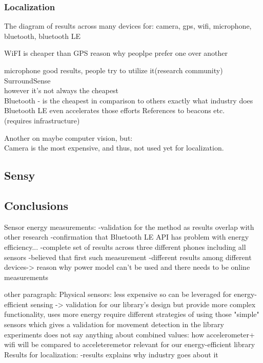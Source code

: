 		
\subsubsection{Localization}

The diagram of results across many devices for: camera, gps, wifi, microphone, bluetooth, bluetooth LE

WiFI is cheaper than GPS
	reason why peoplpe prefer one over another				
				
microphone good results, people try to utilize it(research community)\\
				SurroundSense \cite{azizyan:surroundsense}\\
				however it's not always the cheapest\\
	
Bluetooth - is the cheapest in comparison to others
				exactly what industry does\\
				Bluetooth LE even accelerates those efforts
				References to beacons etc.\\
				(requires infrastructure)
				
Another on maybe computer vision, but:				\\
	Camera is the most expensive, and thus, not used yet for localization.\\
	
			
								
\subsection{Sensy}
\subsection{Conclusions}
Sensor energy measurements:
	-validation for the method
			as results overlap with other research
	-confirmation that Bluetooth LE API has problem with energy efficiency...
	-complete set of results across three different phones including all sensors
		-believed that first such measurement
	-different results among different devices-> reason why power model can't be used and there needs to be online measurements

other paragraph:
	Physical sensors:
		less expensive so can be leveraged for energy-efficient sensing
			-> validation for our library's design
		but provide more complex functionality, uses more energy
			require different strategies of using those "simple" sensors
				which gives a validation for movement detection in the library
		experiments does not say anything about combined values:
			how accelerometer+ wifi will be compared to acceleteremetor
				relevant for our energy-efficient library
	Results for localization: 
		-results explains why industry goes about it